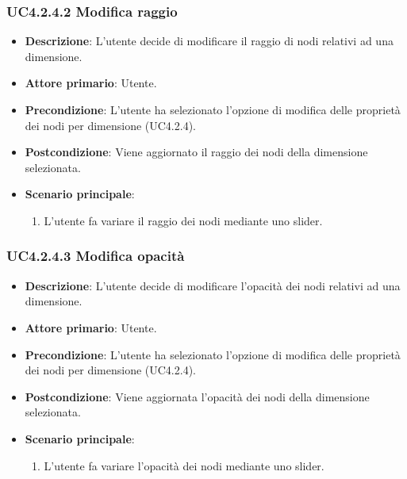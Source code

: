 \subsubsection{UC4.2.4.2 Modifica raggio}

\begin{itemize}
    \item \textbf{Descrizione}: L'utente decide di modificare il raggio di nodi relativi ad una dimensione.
	
    \item \textbf{Attore primario}: Utente.
    
    \item \textbf{Precondizione}:   L'utente ha selezionato l'opzione di modifica delle proprietà dei nodi per dimensione (UC4.2.4).
    \item \textbf{Postcondizione}:  Viene aggiornato il raggio dei nodi della dimensione selezionata.

	\item \textbf{Scenario principale}:
        \begin{enumerate}
            \item L'utente fa variare il raggio dei nodi mediante uno slider.
        \end{enumerate}
\end{itemize}

\subsubsection{UC4.2.4.3 Modifica opacità}

\begin{itemize}
    \item \textbf{Descrizione}:  L'utente decide di modificare l'opacità dei nodi relativi ad una dimensione.

	
    \item \textbf{Attore primario}: Utente.

    \item \textbf{Precondizione}: L'utente ha selezionato l'opzione di modifica delle proprietà dei nodi per dimensione (UC4.2.4).
    \item \textbf{Postcondizione}:  Viene aggiornata l'opacità dei nodi della dimensione selezionata.

	\item \textbf{Scenario principale}:
        \begin{enumerate}
            \item L'utente fa variare l'opacità dei nodi mediante uno slider.
        \end{enumerate}
\end{itemize}


